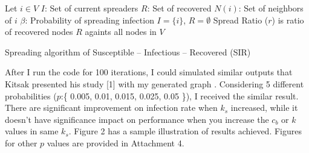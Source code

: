 \documentclass[11pt,a4,twocolumn]{article}
\begin{document}
\begin{algorithm}
\SetAlgoLined
{}
Let $i \in V$\;
$I$: Set of current spreaders\;
$R$: Set of recovered\;
$N(i)$: Set of neighbors of $i$\;
$\beta$: Probability of spreading infection\;
$I = \{ i \}$,   $R = \emptyset$ \;
Spread Ratio ($r$) is ratio of recovered nodes $R$ againts all nodes in $V$ \;
 \caption{Spreading algorithm of Susceptible – Infectious – Recovered (SIR)}
\end{algorithm}

After I run the code for 100 iterations, I could simulated similar outputs that Kitsak presented his study [1] with my generated graph . Considering 5 different probabilities ($p$:\{ 0.005, 0.01, 0.015, 0.025, 0.05 \}), I received the similar result. There are significant improvement on infection rate when  $k_{s}$ increased, while it doesn't have significance impact on performance when you increase the $c_{b}$ or $k$ values in same $k_{s}$. Figure 2 has a sample illustration of results achieved. Figures for other $p$ values are provided in Attachment 4. 
\end{document}
